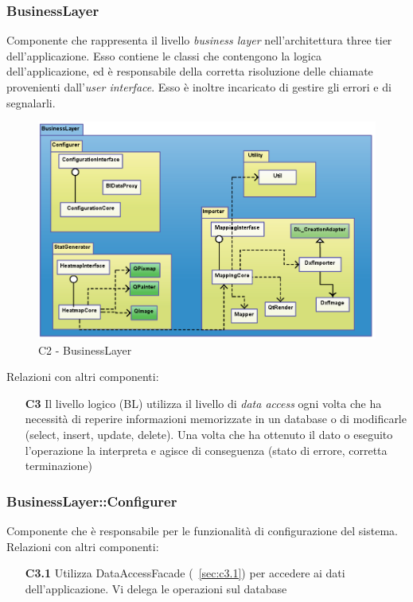 \subsubsection{BusinessLayer} \label{sec:c2}
Componente che rappresenta il livello \textit{business layer} nell'architettura three tier dell'applicazione. Esso contiene le classi che contengono la logica dell'applicazione, ed è responsabile della corretta risoluzione delle chiamate provenienti dall'\textit{user interface}. Esso è inoltre incaricato di gestire gli errori e di segnalarli.
\\
\begin{figure}[!h] 

        \centering 

        \includegraphics[scale=0.4]{./images/c2.png} 

        \caption{C2 - BusinessLayer} 

        \label{fig:c2}

        \end{figure} 

Relazioni con altri componenti: 
\begin{itemize} 
\item [\textbf{C3}]
Il livello logico (BL) utilizza il livello di \textit{data access} ogni volta che ha necessità di reperire informazioni memorizzate in un database o di modificarle (select, insert, update, delete). Una volta che ha ottenuto il dato o eseguito l'operazione la interpreta e agisce di conseguenza (stato di errore, corretta terminazione) 
\end{itemize} 

\subsubsection{BusinessLayer::Configurer} \label{sec:c2.1}
Componente che è responsabile per le funzionalità di configurazione del sistema.\\
Relazioni con altri componenti: 
\begin{itemize} 
\item [\textbf{C3.1}]
Utilizza DataAccessFacade (~\ref{sec:c3.1}) per accedere ai dati dell'applicazione. Vi delega le operazioni sul database 
\end{itemize} 

